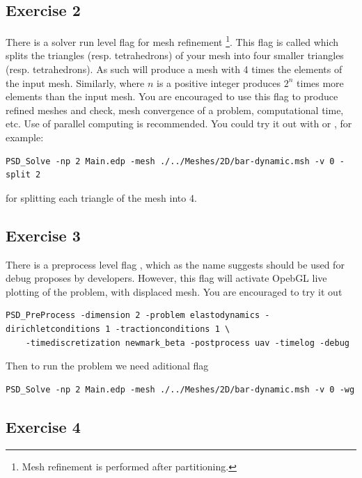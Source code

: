 {{\subsection{Exercise  2}

There is a solver run level flag for mesh refinement \footnote{Mesh refinement is performed after partitioning.}. This flag is called  which splits the triangles (resp. tetrahedrons) of your mesh into  four smaller  triangles (resp. tetrahedrons). As such  will produce a mesh with 4 times the elements of the input mesh. Similarly,  where $n$ is a positive integer produces $2^n$ times more elements than the input mesh. You are encouraged to use this  flag to produce refined meshes and check, mesh convergence of a problem, computational time, etc. Use of parallel computing is recommended. You could try it out with  or , for example:

\begin{lstlisting}[style=BashInputStyle]
	PSD_Solve -np 2 Main.edp -mesh ./../Meshes/2D/bar-dynamic.msh -v 0 -split 2
\end{lstlisting}

for splitting each triangle of the mesh   into 4. 


\subsection{Exercise  3}

There is a preprocess level flag , which as the name suggests should be used for debug proposes by developers. However, this flag will activate OpebGL live plotting of the problem, with displaced mesh. You are encouraged to try it out 

\begin{lstlisting}[style=BashInputStyle]
	PSD_PreProcess -dimension 2 -problem elastodynamics -dirichletconditions 1 -tractionconditions 1 \
	-timediscretization newmark_beta -postprocess uav -timelog -debug
\end{lstlisting}

Then to run the problem we need aditional  flag

\begin{lstlisting}[style=BashInputStyle]
	PSD_Solve -np 2 Main.edp -mesh ./../Meshes/2D/bar-dynamic.msh -v 0 -wg
\end{lstlisting}

\subsection{Exercise  4}

}}
